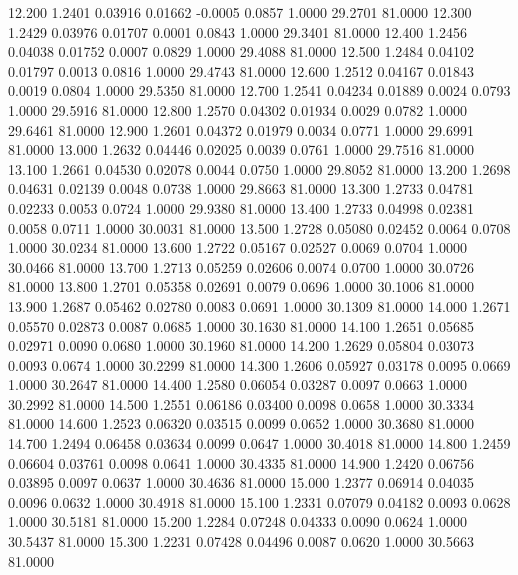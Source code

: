   12.200   1.2401   0.03916   0.01662  -0.0005   0.0857   1.0000  29.2701  81.0000
  12.300   1.2429   0.03976   0.01707   0.0001   0.0843   1.0000  29.3401  81.0000
  12.400   1.2456   0.04038   0.01752   0.0007   0.0829   1.0000  29.4088  81.0000
  12.500   1.2484   0.04102   0.01797   0.0013   0.0816   1.0000  29.4743  81.0000
  12.600   1.2512   0.04167   0.01843   0.0019   0.0804   1.0000  29.5350  81.0000
  12.700   1.2541   0.04234   0.01889   0.0024   0.0793   1.0000  29.5916  81.0000
  12.800   1.2570   0.04302   0.01934   0.0029   0.0782   1.0000  29.6461  81.0000
  12.900   1.2601   0.04372   0.01979   0.0034   0.0771   1.0000  29.6991  81.0000
  13.000   1.2632   0.04446   0.02025   0.0039   0.0761   1.0000  29.7516  81.0000
  13.100   1.2661   0.04530   0.02078   0.0044   0.0750   1.0000  29.8052  81.0000
  13.200   1.2698   0.04631   0.02139   0.0048   0.0738   1.0000  29.8663  81.0000
  13.300   1.2733   0.04781   0.02233   0.0053   0.0724   1.0000  29.9380  81.0000
  13.400   1.2733   0.04998   0.02381   0.0058   0.0711   1.0000  30.0031  81.0000
  13.500   1.2728   0.05080   0.02452   0.0064   0.0708   1.0000  30.0234  81.0000
  13.600   1.2722   0.05167   0.02527   0.0069   0.0704   1.0000  30.0466  81.0000
  13.700   1.2713   0.05259   0.02606   0.0074   0.0700   1.0000  30.0726  81.0000
  13.800   1.2701   0.05358   0.02691   0.0079   0.0696   1.0000  30.1006  81.0000
  13.900   1.2687   0.05462   0.02780   0.0083   0.0691   1.0000  30.1309  81.0000
  14.000   1.2671   0.05570   0.02873   0.0087   0.0685   1.0000  30.1630  81.0000
  14.100   1.2651   0.05685   0.02971   0.0090   0.0680   1.0000  30.1960  81.0000
  14.200   1.2629   0.05804   0.03073   0.0093   0.0674   1.0000  30.2299  81.0000
  14.300   1.2606   0.05927   0.03178   0.0095   0.0669   1.0000  30.2647  81.0000
  14.400   1.2580   0.06054   0.03287   0.0097   0.0663   1.0000  30.2992  81.0000
  14.500   1.2551   0.06186   0.03400   0.0098   0.0658   1.0000  30.3334  81.0000
  14.600   1.2523   0.06320   0.03515   0.0099   0.0652   1.0000  30.3680  81.0000
  14.700   1.2494   0.06458   0.03634   0.0099   0.0647   1.0000  30.4018  81.0000
  14.800   1.2459   0.06604   0.03761   0.0098   0.0641   1.0000  30.4335  81.0000
  14.900   1.2420   0.06756   0.03895   0.0097   0.0637   1.0000  30.4636  81.0000
  15.000   1.2377   0.06914   0.04035   0.0096   0.0632   1.0000  30.4918  81.0000
  15.100   1.2331   0.07079   0.04182   0.0093   0.0628   1.0000  30.5181  81.0000
  15.200   1.2284   0.07248   0.04333   0.0090   0.0624   1.0000  30.5437  81.0000
  15.300   1.2231   0.07428   0.04496   0.0087   0.0620   1.0000  30.5663  81.0000
